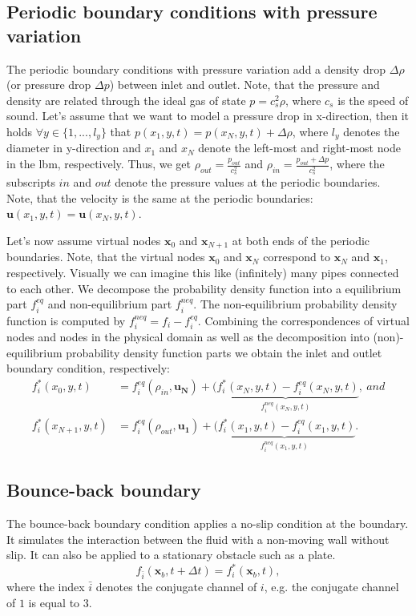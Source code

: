 \documentclass[a4paper,11pt, footsepline]{book}
\begin{document}
\subsection*{Periodic boundary conditions with pressure variation}
The periodic boundary conditions with pressure variation add a density drop $\Delta\rho$ (or pressure drop $\Delta p$) between inlet and outlet. Note, that the pressure and density are related through the ideal gas of state $p=c_{s}^2\rho$, where $c_{s}$ is the speed of sound. \cite{CLAPEYRON.}
Let's assume that we want to model a pressure drop in x-direction, then it holds $\forall y\in\lbrace 1,...,l_{y}\rbrace$ that $p(x_{1},y,t)=p(x_{N},y,t)+\Delta\rho$, where $l_{y}$ denotes the diameter in y-direction and $x_1$ and $x_{N}$ denote the left-most and right-most node in the \ac{lbm}, respectively. Thus, we get $\rho_{out}=\frac{p_{out}}{c_{s}^2}$ and $\rho_{in}=\frac{p_{out}+\Delta p}{c_{s}^2}$, where the subscripts $in$ and $out$ denote the pressure values at the periodic boundaries.
Note, that the velocity is the same at the periodic boundaries: $\mathbf{u}(x_{1},y,t)=\mathbf{u}(x_{N},y,t)$.

Let's now assume virtual nodes $\mathbf{x}_{0}$ and $\mathbf{x}_{N+1}$ at both ends of the periodic boundaries. Note, that the virtual nodes $\mathbf{x}_{0}$ and $\mathbf{x}_{N}$ correspond to $\mathbf{x}_{N}$ and $\mathbf{x}_{1}$, respectively. Visually we can imagine this like (infinitely) many pipes connected to each other. We decompose the probability density function into a equilibrium part $f_{i}^{eq}$ and non-equilibrium part $f_{i}^{neq}$. The non-equilibrium probability density function is computed by $f_{i}^{neq}=f_{i}-f_{i}^{eq}$. Combining the correspondences of virtual nodes and nodes in the physical domain as well as the decomposition into (non)-equilibrium probability density function parts we obtain the inlet and outlet boundary condition, respectively:
\begin{align}
f_{i}^{\ast}(x_0,y,t)&=f_{i}^{eq}(\rho_{in},\mathbf{u_N})+\underbrace{(f_{i}^{\ast}(x_N,y,t)-f_{i}^{eq}(x_N,y,t)}_{f_i^{neq}(x_N,y,t)},~and\\
f_{i}^{\ast}(x_{N+1},y,t)&=f_{i}^{eq}(\rho_{out},\mathbf{u_1})+\underbrace{(f_{i}^{\ast}(x_1,y,t)-f_{i}^{eq}(x_1,y,t)}_{f_i^{neq}(x_1,y,t)}.
\end{align}
\subsection*{Bounce-back boundary}
The bounce-back boundary condition applies a no-slip condition at the boundary. It simulates the interaction between the fluid with a non-moving wall without slip. It can also be applied to a stationary obstacle such as a plate.
\begin{equation}
f_{\bar{i}}(\mathbf{x}_{b},t+\Delta t)=f_{i}^{\ast}(\mathbf{x}_{b},t),
\end{equation}
where the index $\bar{i}$ denotes the conjugate channel of $i$, e.g. the conjugate channel of $1$ is equal to $3$.
\end{document}
